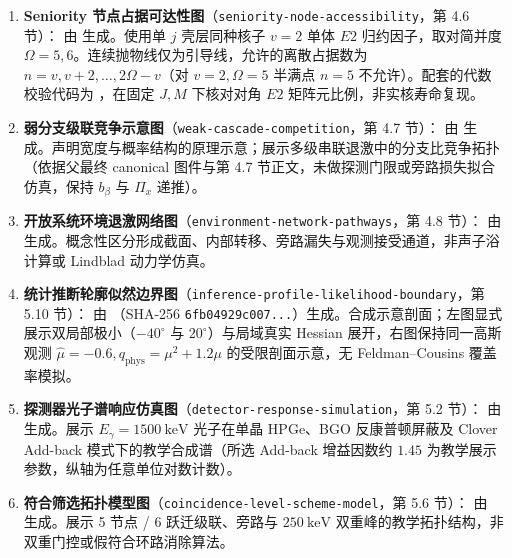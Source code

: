 \begin{enumerate}[label=(\arabic*),leftmargin=2em]
    \vspace{1ex}
    \item \textbf{Seniority 节点占据可达性图}（\texttt{seniority-node-accessibility}，第 4.6 节）：
    由  生成。使用单 $j$ 壳层同种核子 $v=2$ 单体 $E2$ 归约因子，取对简并度 $\Omega=5, 6$。连续抛物线仅为引导线，允许的离散占据数为 $n = v, v+2, \dots, 2\Omega - v$（对 $v=2, \Omega=5$ 半满点 $n=5$ 不允许）。配套的代数校验代码为 ，在固定 $J, M$ 下核对对角 $E2$ 矩阵元比例，非实核寿命复现。
    \vspace{1ex}
    \item \textbf{弱分支级联竞争示意图}（\texttt{weak-cascade-competition}，第 4.7 节）：
    由  生成。声明宽度与概率结构的原理示意；展示多级串联退激中的分支比竞争拓扑（依据父最终 canonical 图件与第 4.7 节正文，未做探测门限或旁路损失拟合仿真，保持 $b_\beta$ 与 $\Pi_x$ 递推）。
    \vspace{1ex}
    \item \textbf{开放系统环境退激网络图}（\texttt{environment-network-pathways}，第 4.8 节）：
    由  生成。概念性区分形成截面、内部转移、旁路漏失与观测接受通道，非声子浴计算或 Lindblad 动力学仿真。
    \vspace{1ex}
    \item \textbf{统计推断轮廓似然边界图}（\texttt{inference-profile-likelihood-boundary}，第 5.10 节）：
    由 （SHA-256 \texttt{6fb04929c007...}）生成。合成示意剖面；左图显式展示双局部极小（$-40^\circ$ 与 $20^\circ$）与局域真实 Hessian 展开，右图保持同一高斯观测 $\hat{\mu}=-0.6, q_{\mathrm{phys}} = \mu^2 + 1.2\mu$ 的受限剖面示意，无 Feldman--Cousins 覆盖率模拟。
    \vspace{1ex}
    \item \textbf{探测器光子谱响应仿真图}（\texttt{detector-response-simulation}，第 5.2 节）：
    由  生成。展示 $E_\gamma = 1500\ \mathrm{keV}$ 光子在单晶 HPGe、BGO 反康普顿屏蔽及 Clover Add-back 模式下的教学合成谱（所选 Add-back 增益因数约 $1.45$ 为教学展示参数，纵轴为任意单位对数计数）。
    \vspace{1ex}
    \item \textbf{符合筛选拓扑模型图}（\texttt{coincidence-level-scheme-model}，第 5.6 节）：
    由  生成。展示 5 节点 / 6 跃迁级联、旁路与 $250\ \mathrm{keV}$ 双重峰的教学拓扑结构，非双重门控或假符合环路消除算法。

\end{enumerate}
